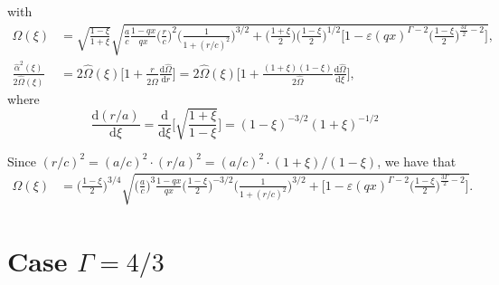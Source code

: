 \documentclass[11pt]{article}
\newcommand{\rd}{\mathrm{d}}
\newcommand{\hOmega}{\widehat{\Omega}}
\newcommand{\halpha}{\widehat{\alpha}}
\begin{document}
with
\begin{align*}
\hOmega(\xi) &=\sqrt{\frac{1-\xi}{1+\xi}} \sqrt{\frac{a}{c}\frac{1-qx}{qx}\bigg( \frac{r}{c}\bigg)^2 \bigg(\frac{1}{1+(r/c)^2}\bigg)^{3/2} 
+ \bigg(\frac{1+\xi}{2}\bigg) \bigg(\frac{1-\xi}{2}\bigg)^{1/2}  \bigg[1- \varepsilon(qx)^{\Gamma-2}\bigg(\frac{1-\xi}{2}\bigg)^{\frac{3\Gamma}{2}-2} \bigg] } ,\\
\frac{\halpha^2(\xi)}{2\hOmega(\xi)} &= 2\hOmega(\xi) \bigg[1+\frac{r}{2\hOmega}\frac{\rd \hOmega }{\rd r}\bigg] = 2\hOmega(\xi) \bigg[1+\frac{(1+\xi)(1-\xi)}{2\hOmega}\frac{\rd \hOmega }{\rd \xi} \bigg],
\end{align*}
where
$$\frac{\rd(r/a)}{\rd \xi} = \frac{\rd}{\rd \xi} \bigg[\sqrt{\frac{1+\xi}{1-\xi}}\bigg] = (1-\xi)^{-3/2}(1+\xi)^{-1/2}$$

Since $(r/c)^2 = (a/c)^2 \cdot (r/a)^2 =  (a/c)^2 \cdot (1+\xi)/(1-\xi)$, we have that
\begin{align*}
\hOmega(\xi) &=\bigg(\frac{1-\xi}{2}\bigg)^{3/4}  \sqrt{\bigg( \frac{a}{c}\bigg)^3\frac{1-qx}{qx} \bigg(\frac{1-\xi}{2}\bigg)^{-3/2} \bigg(\frac{1}{1+(r/c)^2}\bigg)^{3/2} 
+   \bigg[1- \varepsilon(qx)^{\Gamma-2}\bigg(\frac{1-\xi}{2}\bigg)^{\frac{3\Gamma}{2}-2} \bigg] } .
\end{align*}

\section{Case $\Gamma=4/3$}
\end{document}
